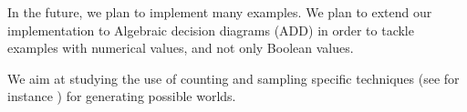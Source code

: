 In the future, we plan to implement many examples. We plan to extend our implementation to Algebraic decision diagrams (ADD) \cite{DBLP:journals/fmsd/BaharFGHMPS97} in order to tackle examples with numerical values, and not only Boolean values.

We aim at studying the use of counting and sampling specific techniques (see for instance \cite{DBLP:conf/aaai/MeelVCFSFIM16}) for generating possible worlds.

